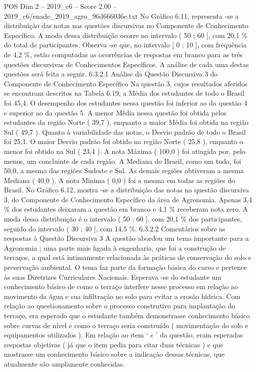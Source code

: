 \begin{textsample}{POS Dim 2 – 2019\_c6 – Score 2.00 – 2019\_c6/enade\_2019\_agro\_96d666036e.txt}
No Gráfico 6.11, representa -se a distribuição das notas nas questões discursivas no Componente de Conhecimento Específico.
A moda dessa distribuição ocorre no intervalo ( 50 ; 60 ], com 20,1 \% do total de participantes.
Observa -se que, no intervalo [ 0 ; 10 ], com frequência de 4,2 \%, estão computadas as ocorrências de respostas em branco para as três questões discursivas de Conhecimentos Específicos.
A análise de cada uma destas questões será feita a seguir. 6.3.2.1 Análise da Questão Discursiva 3 do Componente de Conhecimento Específico Na questão 3, cujos resultados aferidos se encontram descritos na Tabela 6.19, a Média dos estudantes de todo o Brasil foi 45,4.
O desempenho dos estudantes nessa questão foi inferior ao da questão 4 e superior ao da questão 5.
A menor Média nessa questão foi obtida pelos estudantes da região Norte ( 39,7 ), enquanto a maior Média foi obtida na região Sul ( 49,7 ).
Quanto à variabilidade das notas, o Desvio padrão de todo o Brasil foi 25,1.
O maior Desvio padrão foi obtido na região Norte ( 25,8 ), enquanto o menor foi obtido na Sul ( 23,4 ).
A nota Máxima ( 100,0 ) foi atingida por, pelo menos, um concluinte de cada região.
A Mediana do Brasil, como um todo, foi 50,0, a mesma das regiões Sudeste e Sul.
As demais regiões obtiveram a mesma Mediana ( 40,0 ).
A nota Mínima ( 0,0 ) foi a mesma em todas as regiões do Brasil.
No Gráfico 6.12, mostra -se a distribuição das notas na questão discursiva 3, do Componente de Conhecimento Específico da área de Agronomia.
Apenas 3,4 \% dos estudantes deixaram a questão em branco e 4,1 \% receberam nota zero.
A moda dessa distribuição é o intervalo ( 50 ; 60 ], com 20,1 \% dos participantes, seguido do intervalo ( 30 ; 40 ], com 14,5 \%. 6.3.2.2 Comentários sobre as respostas à Questão Discursiva 3 A questão abordou um tema importante para a Agronomia ; uma parte mais ligada à engenharia, que foi a construção de terraços, a qual está intimamente relacionada às práticas de conservação do solo e preservação ambiental.
O tema faz parte da formação básica do curso e pertence às suas Diretrizes Curriculares Nacionais.
Esperava -se do estudante um conhecimento básico de como o terraço interfere nesse processo em relação ao movimento da água e sua infiltração no solo para evitar a erosão hídrica.
Com relação ao questionamento sobre o processo construtivo para implantação do terraço, era esperado que o estudante também demonstrasse conhecimento básico sobre curvas de nível e como o terraço seria construído ( movimentação do solo e equipamentos utilizados ).
Em relação ao item ‘ c ’ da questão, eram esperadas respostas objetivas ( já que o item pedia para citar duas técnicas ) e que mostrasse um conhecimento básico sobre a indicação dessas técnicas, que atualmente são amplamente conhecidas.

\end{textsample}
